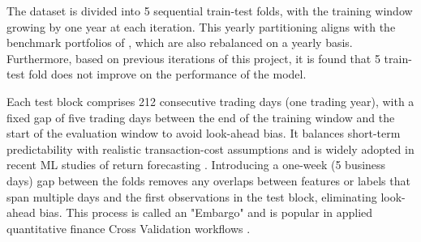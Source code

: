 The dataset is divided into 5 sequential train-test folds, with the training window growing by one year at each iteration. This yearly partitioning aligns with the benchmark portfolios of , which are also rebalanced on a yearly basis. Furthermore, based on previous iterations of this project, it is found that 5 train-test fold does not improve on the performance of the model. 

Each test block comprises 212 consecutive trading days (one trading year), with a fixed gap of five trading days between the end of the training window and the start of the evaluation window to avoid look-ahead bias. It balances short-term predictability with realistic transaction-cost assumptions and is widely adopted in recent ML studies of return forecasting \cite{htun_2024}. Introducing a one-week (5 business days) gap between the folds removes any overlaps between features or labels that span multiple days and the first observations in the test block, eliminating look-ahead bias. This process is called an "Embargo" and is popular in applied quantitative finance Cross Validation workflows \cite{embargo_2020}. %



